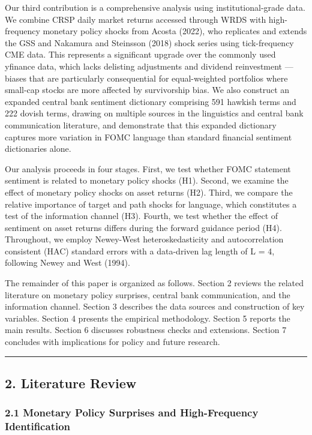 \documentclass[12pt]{article}
\begin{document}
Our third contribution is a comprehensive analysis using
institutional-grade data. We combine CRSP daily market returns accessed
through WRDS with high-frequency monetary policy shocks from Acosta
(2022), who replicates and extends the GSS and Nakamura and Steinsson
(2018) shock series using tick-frequency CME data. This represents a
significant upgrade over the commonly used yfinance data, which lacks
delisting adjustments and dividend reinvestment --- biases that are
particularly consequential for equal-weighted portfolios where small-cap
stocks are more affected by survivorship bias. We also construct an
expanded central bank sentiment dictionary comprising 591 hawkish terms
and 222 dovish terms, drawing on multiple sources in the linguistics and
central bank communication literature, and demonstrate that this
expanded dictionary captures more variation in FOMC language than
standard financial sentiment dictionaries alone.

Our analysis proceeds in four stages. First, we test whether FOMC
statement sentiment is related to monetary policy shocks (H1). Second,
we examine the effect of monetary policy shocks on asset returns (H2).
Third, we compare the relative importance of target and path shocks for
language, which constitutes a test of the information channel (H3).
Fourth, we test whether the effect of sentiment on asset returns differs
during the forward guidance period (H4). Throughout, we employ
Newey-West heteroskedasticity and autocorrelation consistent (HAC)
standard errors with a data-driven lag length of L = 4, following Newey
and West (1994).

The remainder of this paper is organized as follows. Section 2 reviews
the related literature on monetary policy surprises, central bank
communication, and the information channel. Section 3 describes the data
sources and construction of key variables. Section 4 presents the
empirical methodology. Section 5 reports the main results. Section 6
discusses robustness checks and extensions. Section 7 concludes with
implications for policy and future research.

\begin{center}\rule{0.5\linewidth}{0.5pt}\end{center}

\subsection{2. Literature Review}\label{literature-review}

\subsubsection{2.1 Monetary Policy Surprises and High-Frequency
Identification}\label{monetary-policy-surprises-and-high-frequency-identification}
\end{document}
